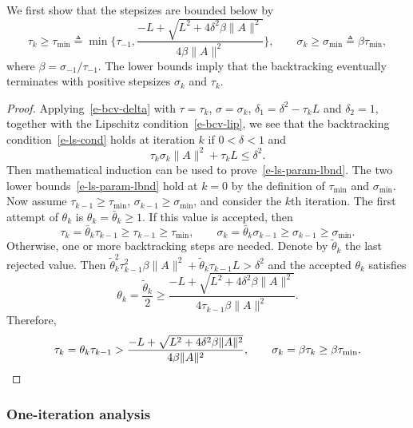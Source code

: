 \documentclass[letterpaper,11pt]{article}
\newcommand{\BEQ}{\begin{equation}}
\newcommand{\EEQ}{\end{equation}}
\begin{document}
We first show that the stepsizes are bounded below by
\BEQ \label{e-ls-param-lbnd}
  \tau_k \geq \tau_\mathrm{min} \triangleq \min{\Big\{\tau_{-1},
  \frac{-L+\sqrt{L^2+4\delta^2\beta\|A\|^2}}{4\beta\|A\|^2}\Big\}},
  \qquad
  \sigma_k \geq \sigma_\mathrm{min} \triangleq \beta\tau_\mathrm{min},
\EEQ
where $\beta=\sigma_{-1}/\tau_{-1}$.
The lower bounds imply that the backtracking eventually terminates
with positive stepsizes $\sigma_k$ and $\tau_k$.
\begin{proof}
Applying~\eqref{e-bcv-delta} with $\tau=\tau_k$, $\sigma=\sigma_k$, $\delta_1=\delta^2-\tau_k L$ and $\delta_2=1$,
together with the Lipschitz condition~\eqref{e-bcv-lip},
we see that the backtracking condition~\eqref{e-ls-cond} holds
at iteration $k$ if $0 < \delta < 1$ and
\[
\tau_k \sigma_k\|A\|^2 + \tau_k L \leq \delta^2.
\]
Then mathematical induction can be used to prove~\eqref{e-ls-param-lbnd}.
The two lower bounds~\eqref{e-ls-param-lbnd} hold at $k=0$
by the definition of $\tau_\mathrm{min}$ and $\sigma_\mathrm{min}$.
Now assume $\tau_{k-1} \geq \tau_\mathrm{min}$,
$\sigma_{k-1} \geq \sigma_\mathrm{min}$,
and consider the $k$th iteration.
The first attempt of $\theta_k$ is $\theta_k=\bar \theta_k \geq 1$.
If this value is accepted, then
\[
\tau_k = \bar\theta_k \tau_{k-1} \geq \tau_{k-1} \geq \tau_\mathrm{min},
\qquad
\sigma_k = \bar\theta_k \sigma_{k-1} \geq \sigma_{k-1} \geq
  \sigma_\mathrm{min}.
\]
Otherwise, one or more backtracking steps are needed.
Denote by $\tilde \theta_k$ the last rejected value.
Then $\tilde\theta_k^2\tau_{k-1}^2\beta\|A\|^2 + 
\tilde\theta_k \tau_{k-1} L >\delta^2$
and the accepted $\theta_k$ satisfies
\[
\theta_k = \frac{\tilde \theta_k}{2} \geq
\frac{-L+\sqrt{L^2+4\delta^2\beta\|A\|^2}}%
  {4\tau_{k-1}\beta\|A\|^2}.
\]
Therefore,
\[
\tau_k=\theta_k\tau_{k-1} >
\frac{-L+\sqrt{L^2+4\delta^2\beta\|A\|^2}}{4\beta\|A\|^2}, \qquad
\sigma_k=\beta\tau_k \geq \beta\tau_\mathrm{min}. \qedhere
\]
\end{proof}

\subsubsection{One-iteration analysis} \label{e-cv-1iter}
\end{document}
